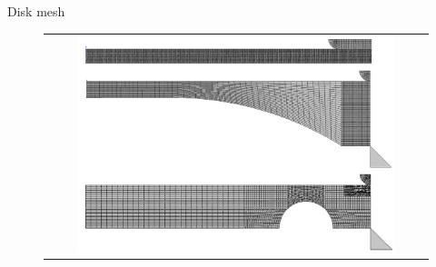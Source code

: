 \documentclass[9pt]{beamer}
\begin{document}

\begin{frame}[noframenumbering]{Disk mesh}

	\begin{figure}
        \begin{tabular}{c}
            \includegraphics[width=0.85\textwidth]{Images/disk_mesh.pdf}
        \end{tabular}
    \end{figure}

\end{frame}

\end{document}
